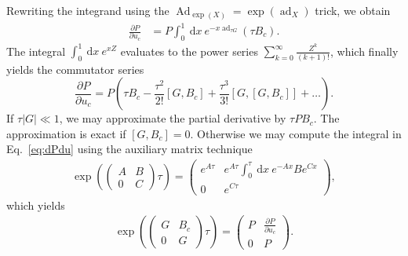 \documentclass[aps, pra, a4paper, longbibliography, superscriptaddress]{revtex4-1}
\newcommand{\be}{\begin{equation}}
\newcommand{\ee}{\end{equation}}
\newcommand{\comm}[2]{\left[ #1, #2 \right]}
\DeclareMathOperator{\Ad}{Ad}
\DeclareMathOperator{\ad}{ad}
\newcommand{\dd}[2]{\frac{\partial #1}{\partial #2}}
\newcommand{\wrt}[1]{\:\mathrm{d}#1\:} %
\begin{document}
Rewriting the integrand using the $\Ad_{\exp(X)} = \exp(\ad_X)$ trick,
we obtain
\begin{align}
\dd{P}{u_{c}}
&=
P
\int_0^1 \wrt{x}
e^{-x \ad_{\tau G}}
(\tau B_c).
\end{align}
The integral 
$\int_0^1 \wrt{x} e^{x Z}$
evaluates to the power series
$\sum_{k=0}^\infty \frac{Z^k}{(k+1)!}$,
which finally yields the commutator series
\be
\dd{P}{u_{c}}
= P \left(\tau B_c -\frac{\tau^2}{2!}\comm{G}{B_c}
+\frac{\tau^3}{3!}\comm{G}{\comm{G}{B_c}}
+\ldots \right).
\ee
If $\tau |G| \ll 1$, we may approximate the partial derivative by $\tau P B_c$.
The approximation is exact if $\comm{G}{B_c} = 0$.
Otherwise we may compute the integral in Eq.~\eqref{eq:dPdu}
using the auxiliary matrix technique
\begin{align}
\exp \left(
\begin{pmatrix}
A & B\\
0 & C
\end{pmatrix} \tau\right)
=
\begin{pmatrix}
e^{A \tau} &
e^{A \tau} \int_0^\tau \wrt{x} e^{-A x} B e^{C x}
\\
0 & e^{C \tau}
\end{pmatrix},
\end{align}
which yields
\begin{align}
\exp \left(
\begin{pmatrix}
G & B_c\\
0 & G
\end{pmatrix} \tau\right)
=
\begin{pmatrix}
P & \dd{P}{u_c}\\
0 & P
\end{pmatrix}.
\end{align}
\end{document}
